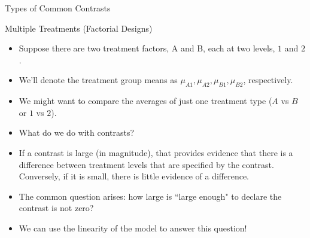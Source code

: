 \begin{frame}[allowframebreaks]{Types of Common Contrasts}
  \begin{block}{Multiple Treatments (Factorial Designs)}
    \begin{itemize}
        \item Suppose there are two treatment factors, A and B, each at two levels, $1$ and $2$.
        \item We'll denote the treatment group means as $\mu_{A1}, \mu_{A2}, \mu_{B1}, \mu_{B2}$, respectively.
        \item We might want to compare the averages of just one treatment type ($A$ vs $B$ or $1$ vs $2$).
    \end{itemize}
  \end{block}
  
  
  \framebreak
  
  \begin{itemize}
    \item What do we do with contrasts?
    \item If a contrast is large (in magnitude), that provides evidence that there is a difference between treatment levels that are specified by the contrast. Conversely, if it is small, there is little evidence of a difference.
    \item The common question arises: how large is ``large enough" to declare the contrast is not zero?
    \item We can use the linearity of the model to answer this question!
  \end{itemize}
  
\end{frame}

